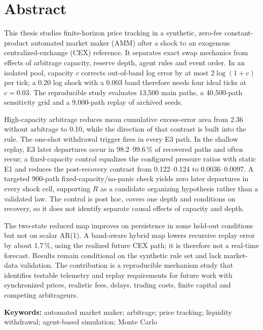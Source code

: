 \section{Abstract}

This thesis studies finite-horizon price tracking in a synthetic, zero-fee constant-product automated market maker (AMM) after a shock to an exogenous centralized-exchange (CEX) reference. It separates exact swap mechanics from effects of arbitrage capacity, reserve depth, agent rules and event order. In an isolated pool, capacity $c$ corrects out-of-band log error by at most $2\log(1+c)$ per tick; a 0.20 log shock with a 0.003 band therefore needs four ideal ticks at $c=0.03$. The reproducible study evaluates 13,500 main paths, a 40,500-path sensitivity grid and a 9,000-path replay of archived seeds.

High-capacity arbitrage reduces mean cumulative excess-error area from 2.36 without arbitrage to 0.10, while the direction of that contrast is built into the rule. The one-shot withdrawal trigger fires in every E3 path. In the shallow replay, E3 later departures occur in 98.2--99.6\,\% of recovered paths and often recur; a fixed-capacity control equalizes the configured pressure ratios with static E1 and reduces the post-recovery contrast from 0.122--0.124 to 0.0036--0.0097. A targeted 900-path fixed-capacity/no-panic check yields zero later departures in every shock cell, supporting $R$ as a candidate organizing hypothesis rather than a validated law. The control is post hoc, covers one depth and conditions on recovery, so it does not identify separate causal effects of capacity and depth.

The two-state reduced map improves on persistence in some held-out conditions but not on scalar AR(1). A band-aware hybrid map lowers recursive replay error by about 1.7\,\%, using the realized future CEX path; it is therefore not a real-time forecast. Results remain conditional on the synthetic rule set and lack market-data validation. The contribution is a reproducible mechanism study that identifies testable telemetry and replay requirements for future work with synchronized prices, realistic fees, delays, trading costs, finite capital and competing arbitrageurs.

\textbf{Keywords:} automated market maker; arbitrage; price tracking; liquidity withdrawal; agent-based simulation; Monte Carlo
